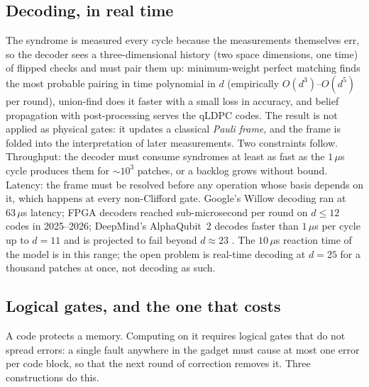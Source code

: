 \subsection{Decoding, in real time}

The syndrome is measured every cycle because the measurements themselves err, so the decoder sees
a three-dimensional history (two space dimensions, one time) of flipped checks and must pair
them up: minimum-weight perfect matching finds the most probable pairing in time polynomial in
$d$ (empirically $O(d^3)$--$O(d^5)$ per round), union-find does it faster with a small loss in
accuracy, and belief propagation with post-processing serves the qLDPC codes. The result is not
applied as physical gates: it updates a classical \emph{Pauli frame}, and the frame is folded
into the interpretation of later measurements. Two constraints follow. Throughput: the decoder
must consume syndromes at least as fast as the $1\,\mu$s cycle produces them for $\sim10^3$
patches, or a backlog grows without bound. Latency: the frame must be resolved before any
operation whose basis depends on it, which happens at every non-Clifford gate. Google's Willow
decoding ran at $63\,\mu$s latency; FPGA decoders reached sub-microsecond per round on
$d\le12$ codes in 2025--2026; DeepMind's AlphaQubit~2 decodes faster than $1\,\mu$s per cycle
up to $d=11$ and is projected to fail beyond $d\approx23$ \cite{ph:uqt26}. The $10\,\mu$s reaction
time of the model is in this range; the open problem is real-time decoding at $d=25$ for a
thousand patches at once, not decoding as such.

\subsection{Logical gates, and the one that costs}\label{ph:sec:ft}

A code protects a memory. Computing on it requires logical gates that do not spread errors:
a single fault anywhere in the gadget must cause at most one error per code block, so that the
next round of correction removes it. Three constructions do this.

